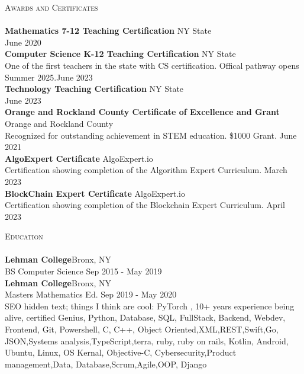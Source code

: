 \documentclass[a4paper]{article}
\newcommand{\lineunder} {
    \vspace*{-8pt} \\
    \hspace*{-18pt} \hrulefill \\
}
\newcommand{\header} [1] {
    {\hspace*{-18pt}\vspace*{6pt} \textsc{#1}}
    \vspace*{-6pt} \lineunder
}
\begin{document}
\header{Awards and Certificates}
\textbf{Mathematics 7-12 Teaching Certification} \hfill NY State\\
\hfill June 2020\\
\vspace*{2mm}
\textbf{Computer Science K-12 Teaching Certification} \hfill NY State\\
One of the first teachers in the state with CS certification. Offical pathway opens Summer 2025.\hfill June 2023\\
\vspace*{2mm}
\textbf{Technology Teaching Certification} \hfill NY State\\
\hfill June 2023\\
\vspace*{2mm}
\textbf{Orange and Rockland County Certificate of Excellence and Grant} \hfill Orange and Rockland County\\
Recognized for outstanding achievement in STEM education. \$1000 Grant. \hfill June 2021\\
\vspace*{2mm}
\textbf{AlgoExpert Certificate} \hfill AlgoExpert.io\\
Certification showing completion of the Algorithm Expert Curriculum. \hfill March 2023\\
\vspace*{2mm}
\textbf{BlockChain Expert Certificate} \hfill AlgoExpert.io\\
Certification showing completion of the Blockchain Expert Curriculum. \hfill April 2023\\
\vspace*{2mm}

\header{Education}
\textbf{Lehman College}\hfill Bronx, NY\\
BS Computer Science \hfill Sep 2015 - May 2019\\
\vspace{2mm}
\textbf{Lehman College}\hfill Bronx, NY\\
Masters Mathematics Ed. \hfill Sep 2019 - May 2020\\
\vspace{2mm}
\color{white}
\tiny
SEO hidden text; things I think are cool: PyTorch , 10+ years experience being alive, certified Genius, Python, Database, SQL, FullStack, Backend, Webdev, Frontend, Git, Powershell, C, C++, Object Oriented,XML,REST,Swift,Go, JSON,Systems analysis,TypeScript,terra, ruby, ruby on rails, Kotlin, Android, Ubuntu, Linux, OS Kernal, Objective-C, Cybersecurity,Product management,Data, Database,Scrum,Agile,OOP, Django

\ 
\end{document}
